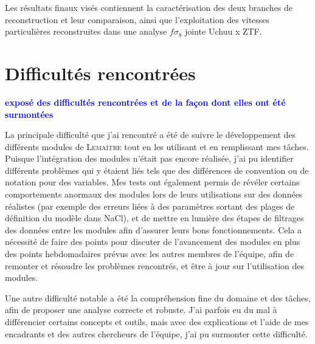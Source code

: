 \documentclass{book}
\newcommand{\consignes}[1]{{\textcolor{blue}{\bf \large #1}}}
\def\lemaitre{\textsc{Lemaître}\xspace}
\begin{document}
Les résultats finaux visés contiennent la caractérisation des deux branches de reconstruction et leur comparaison, ainsi que l'exploitation des vitesses particulières reconstruites dans une analyse $f\sigma_8$ jointe Uchuu x ZTF.

\section{Difficultés rencontrées}
\consignes{exposé des difficultés rencontrées et de la façon dont elles ont été surmontées}

La principale difficulté que j'ai rencontré a été de suivre le développement des différents modules de \lemaitre tout en les utilisant et en remplissant mes tâches. Puisque l'intégration des modules n'était pas encore réalisée, j'ai pu identifier différents problèmes qui y étaient liés tels que des différences de convention ou de notation pour des variables. Mes tests ont également permis de révéler certains comportements anormaux des modules lors de leurs utilisations sur des données réalistes (par exemple des erreurs liées à des paramètres sortant des plages de définition du modèle dans NaCl), et de mettre en lumière des étapes de filtrages des données entre les modules afin d'assurer leurs bons fonctionnements. Cela a nécessité de faire des points pour discuter de l'avancement des modules en plus des points hebdomadaires prévus avec les autres membres de l'équipe, afin de remonter et résoudre les problèmes rencontrés, et être à jour sur l'utilisation des modules.

Une autre difficulté notable a été la compréhension fine du domaine et des tâches, afin de proposer une analyse correcte et robuste. J'ai parfois eu du mal à différencier certains concepts et outils, mais avec des explications et l'aide de mes encadrants et des autres chercheurs de l'équipe, j'ai pu surmonter cette difficulté.
\end{document}
